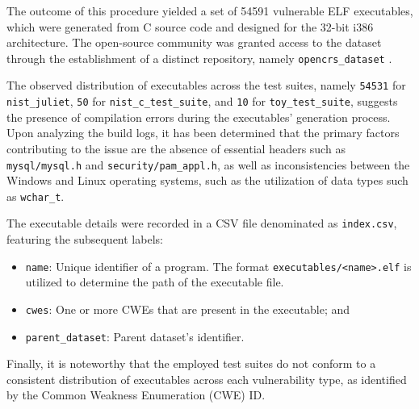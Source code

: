 \documentclass[../main.tex]{subfiles}
\begin{document}
The outcome of this procedure yielded a set of 54591 vulnerable ELF
executables, which were generated from C source code and designed for the
32-bit i386 architecture. The open-source community was granted access to the
dataset through the establishment of a distinct repository, namely
\texttt{opencrs\_dataset} \cite{opencrs_dataset}.

The observed distribution of executables across the test suites, namely
\texttt{54531} for \texttt{nist\_juliet}, \texttt{50} for
\texttt{nist\_c\_test\_suite}, and \texttt{10} for \texttt{toy\_test\_suite},
suggests the presence of compilation errors during the executables' generation
process. Upon analyzing the build logs, it has been determined that the primary
factors contributing to the issue are the absence of essential headers such as
\texttt{mysql/mysql.h} and \texttt{security/pam\_appl.h}, as well as
inconsistencies between the Windows and Linux operating systems, such as the
utilization of data types such as \texttt{wchar\_t}.

The executable details were recorded in a CSV file denominated as
\texttt{index.csv}, featuring the subsequent labels:

\begin{itemize}
  \tightlist
  \item
        \texttt{name}: Unique identifier of a program. The format
        \texttt{executables/\textless{}name\textgreater{}.elf} is utilized to
        determine the path of the executable file.
  \item
        \texttt{cwes}: One or more CWEs that are present in the executable;
        and
  \item
        \texttt{parent\_dataset}: Parent dataset's identifier.
\end{itemize}

Finally, it is noteworthy that the employed test suites do not conform to a
consistent distribution of executables across each vulnerability type, as
identified by the Common Weakness Enumeration (CWE) ID.
\end{document}
